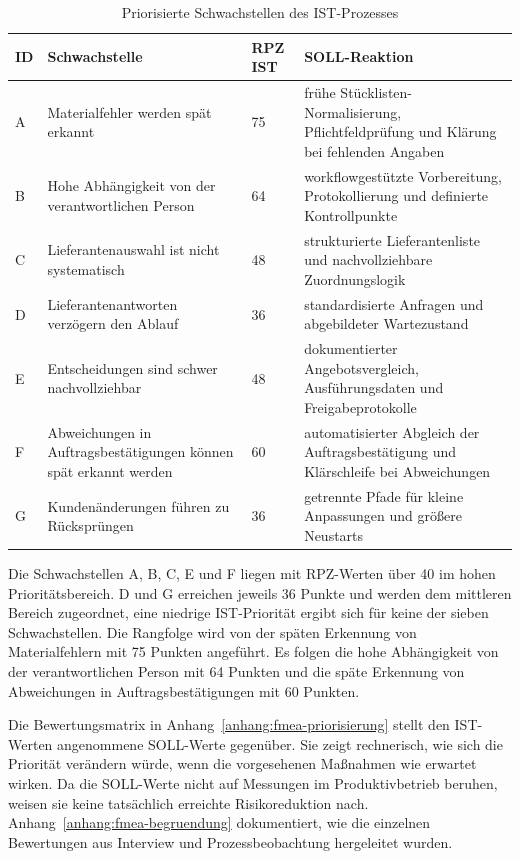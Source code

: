 \documentclass[a4paper,12pt]{article}
\begin{document}
\begin{table}[H]
    \captionsetup{justification=raggedright,singlelinecheck=false}
    \caption{Priorisierte Schwachstellen des IST-Prozesses}
    \label{tab:schwachstellen-priorisierung}
    \footnotesize
    \begin{tabularx}{\textwidth}{@{}lXlX@{}}
        \toprule
        ID & Schwachstelle & RPZ IST & SOLL-Reaktion \\
        \midrule
        A & Materialfehler werden spät erkannt & 75 & frühe Stücklisten-Normalisierung, Pflichtfeldprüfung und Klärung bei fehlenden Angaben \\
        \midrule
        B & Hohe Abhängigkeit von der verantwortlichen Person & 64 & workflowgestützte Vorbereitung, Protokollierung und definierte Kontrollpunkte \\
        \midrule
        C & Lieferantenauswahl ist nicht systematisch & 48 & strukturierte Lieferantenliste und nachvollziehbare Zuordnungslogik \\
        \midrule
        D & Lieferantenantworten verzögern den Ablauf & 36 & standardisierte Anfragen und abgebildeter Wartezustand \\
        \midrule
        E & Entscheidungen sind schwer nachvollziehbar & 48 & dokumentierter Angebotsvergleich, Ausführungsdaten und Freigabeprotokolle \\
        \midrule
        F & Abweichungen in Auftragsbestätigungen können spät erkannt werden & 60 & automatisierter Abgleich der Auftragsbestätigung und Klärschleife bei Abweichungen \\
        \midrule
        G & Kundenänderungen führen zu Rücksprüngen & 36 & getrennte Pfade für kleine Anpassungen und größere Neustarts \\
        \bottomrule
    \end{tabularx}
\end{table}

Die Schwachstellen A, B, C, E und F liegen mit RPZ-Werten über 40 im hohen Prioritätsbereich. D und G erreichen jeweils 36 Punkte und werden dem mittleren Bereich zugeordnet, eine niedrige IST-Priorität ergibt sich für keine der sieben Schwachstellen. Die Rangfolge wird von der späten Erkennung von Materialfehlern mit 75 Punkten angeführt. Es folgen die hohe Abhängigkeit von der verantwortlichen Person mit 64 Punkten und die späte Erkennung von Abweichungen in Auftragsbestätigungen mit 60 Punkten.

Die Bewertungsmatrix in Anhang~\ref{anhang:fmea-priorisierung} stellt den IST-Werten angenommene SOLL-Werte gegenüber. Sie zeigt rechnerisch, wie sich die Priorität verändern würde, wenn die vorgesehenen Maßnahmen wie erwartet wirken. Da die SOLL-Werte nicht auf Messungen im Produktivbetrieb beruhen, weisen sie keine tatsächlich erreichte Risikoreduktion nach. Anhang~\ref{anhang:fmea-begruendung} dokumentiert, wie die einzelnen Bewertungen aus Interview und Prozessbeobachtung hergeleitet wurden.
\end{document}
